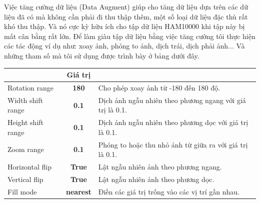 \documentclass[12pt,a4paper]{article}
\begin{document}
	\noindent
	Việc tăng cường dữ liệu (Data Augment) giúp cho tăng dữ liệu dựa trên các dữ liệu đã có mà không cần phải đi thu thập thêm, một số loại dữ liệu đặc thù rất khó thu thập. Và nó cực kỳ hữu ích cho tập dữ liệu HAM10000 khi tập này bị mất cân bằng rất lớn. Để làm giàu tập dữ liệu bằng việc tăng cường tôi thực hiện các tác động ví dụ như: xoay ảnh, phóng to ảnh, dịch trái, dịch phải ảnh... Và những tham số mà tôi sử dụng được trình bày ở bảng dưới đây.
	
	\begin{center}
		\begin{tabular}{|l|c|l|}
			\hline
			\rowcolor[HTML]{000000} 
			\multicolumn{1}{|c|}{\cellcolor[HTML]{000000}{\color[HTML]{FFFFFF} \textbf{Tham số}}} & {\color[HTML]{FFFFFF} \textbf{Giá trị}} & \multicolumn{1}{c|}{\cellcolor[HTML]{000000}{\color[HTML]{FFFFFF} \textbf{Mô tả}}} \\ \hline
			Rotation range                                                                        & \textbf{180}                            & Cho phép xoay ảnh từ -180 đến 180 độ.                                              \\ \hline
			Width shift range                                                                     & \textbf{0.1}                            & Dịch ảnh ngẫu nhiên theo phương ngang với giá trị là 0.1.                          \\ \hline
			Height shift range                                                                    & \textbf{0.1}                            & Dịch ảnh ngẫu nhiên theo phương dọc với giá trị là 0.1.                            \\ \hline
			Zoom range                                                                            & \textbf{0.1}                            & Phóng to hoặc thu nhỏ ảnh từ giữa ra với giá trị là 0.1.                           \\ \hline
			Horizontal flip                                                                       & \textbf{True}                           & Lật ngẫu nhiên ảnh theo phương ngang.                                              \\ \hline
			Vertical flip                                                                         & \textbf{True}                           & Lật ngẫu nhiên ảnh theo phương dọc.                                                \\ \hline
			Fill mode                                                                             & \textbf{nearest}                        & Điền các giá trị trống vào các vị trí gần nhau.                                    \\ \hline
		\end{tabular}
	\end{center}
\end{document}
